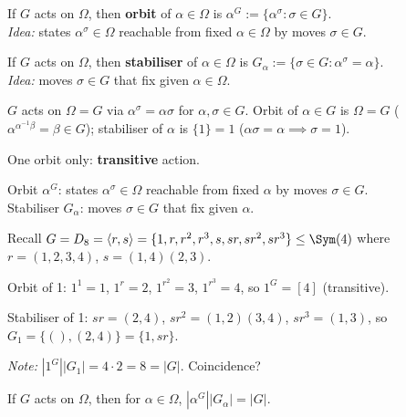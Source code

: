 \begin{slide}
    \begin{definition}[orbit]
        \vspace{0pt}
        If $G$ acts on $\Omega$, then \textbf{orbit} of $\alpha \in \Omega$ is $\alpha^G := \{\alpha^\sigma : \sigma \in G\}$. \\
        \textit{Idea:} states $\alpha^\sigma \in \Omega$ reachable from fixed $\alpha \in \Omega$ by moves $\sigma \in G$. \pause
    \end{definition}

    \begin{definition}[stabiliser]
        \vspace{0pt}
        If $G$ acts on $\Omega$, then \textbf{stabiliser} of $\alpha \in \Omega$ is $G_\alpha := \{\sigma \in G : \alpha^\sigma = \alpha\}$. \\
        \textit{Idea:} moves $\sigma \in G$ that fix given $\alpha \in \Omega$. \pause
    \end{definition}

    \begin{example}
        \vspace{0pt}
        $G$ acts on $\Omega = G$ via $\alpha^\sigma = \alpha \sigma$ for $\alpha,\sigma \in G$. Orbit of $\alpha \in G$ is \pause $\Omega = G$ ($\alpha^{\alpha^{-1}\beta} = \beta \in G$); stabiliser of $\alpha$ is \pause $\{1\} = 1$ ($\alpha\sigma = \alpha \implies \sigma = 1$).

        One orbit only: \textbf{transitive} action.
    \end{example}
\end{slide}

\begin{slide}
    Orbit $\alpha^G$: states $\alpha^\sigma \in \Omega$ reachable from fixed $\alpha$ by moves $\sigma \in G$. \\
    Stabiliser $G_\alpha$: moves $\sigma \in G$ that fix given $\alpha$.

    \begin{example}
        \vspace{0pt}
        Recall $G = D_8 = \langle r,s \rangle = \{1,r,r^2,r^3,s,sr,sr^2,sr^3\} \leq \Sym(4)$ where $r = (1,2,3,4)$, $s = (1,4)(2,3)$.

        Orbit of 1: $1^1 = 1$, $1^r = 2$, $1^{r^2} = 3$, $1^{r^3} = 4$, so $1^G = [4]$ (transitive).

        Stabiliser of 1: $sr = (2,4)$, $sr^2 = (1,2)(3,4)$, $sr^3 = (1,3)$, so $G_1 = \{(),(2,4)\} = \{1,sr\}$.

        \textit{Note:} $|1^G||G_1| = 4 \cdot 2 = 8 = |G|$. Coincidence?
    \end{example}

    \begin{theorem}
        \vspace{0pt}
        If $G$ acts on $\Omega$, then for $\alpha \in \Omega$, $|\alpha^G||G_\alpha| = |G|$.
    \end{theorem}
\end{slide}